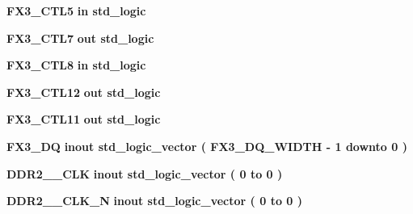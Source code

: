 \begin{DoxyCompactItemize}
{\bf F\+X3\+\_\+\+C\+T\+L5}  {\bfseries {\bfseries \textcolor{keywordflow}{in}\textcolor{vhdlchar}{ }}} {\bfseries \textcolor{comment}{std\+\_\+logic}\textcolor{vhdlchar}{ }} 
\item 
{\bf F\+X3\+\_\+\+C\+T\+L7}  {\bfseries {\bfseries \textcolor{keywordflow}{out}\textcolor{vhdlchar}{ }}} {\bfseries \textcolor{comment}{std\+\_\+logic}\textcolor{vhdlchar}{ }} 
\item 
{\bf F\+X3\+\_\+\+C\+T\+L8}  {\bfseries {\bfseries \textcolor{keywordflow}{in}\textcolor{vhdlchar}{ }}} {\bfseries \textcolor{comment}{std\+\_\+logic}\textcolor{vhdlchar}{ }} 
\item 
{\bf F\+X3\+\_\+\+C\+T\+L12}  {\bfseries {\bfseries \textcolor{keywordflow}{out}\textcolor{vhdlchar}{ }}} {\bfseries \textcolor{comment}{std\+\_\+logic}\textcolor{vhdlchar}{ }} 
\item 
{\bf F\+X3\+\_\+\+C\+T\+L11}  {\bfseries {\bfseries \textcolor{keywordflow}{out}\textcolor{vhdlchar}{ }}} {\bfseries \textcolor{comment}{std\+\_\+logic}\textcolor{vhdlchar}{ }} 
\item 
{\bf F\+X3\+\_\+\+DQ}  {\bfseries {\bfseries \textcolor{keywordflow}{inout}\textcolor{vhdlchar}{ }}} {\bfseries \textcolor{comment}{std\+\_\+logic\+\_\+vector}\textcolor{vhdlchar}{ }\textcolor{vhdlchar}{(}\textcolor{vhdlchar}{ }\textcolor{vhdlchar}{ }\textcolor{vhdlchar}{ }\textcolor{vhdlchar}{ }{\bfseries {\bf F\+X3\+\_\+\+D\+Q\+\_\+\+W\+I\+D\+TH}} \textcolor{vhdlchar}{-\/}\textcolor{vhdlchar}{ } \textcolor{vhdldigit}{1} \textcolor{vhdlchar}{ }\textcolor{keywordflow}{downto}\textcolor{vhdlchar}{ }\textcolor{vhdlchar}{ } \textcolor{vhdldigit}{0} \textcolor{vhdlchar}{ }\textcolor{vhdlchar}{)}\textcolor{vhdlchar}{ }} 
\item 
{\bf D\+D\+R2\+\_\+\_\+\+C\+LK}  {\bfseries {\bfseries \textcolor{keywordflow}{inout}\textcolor{vhdlchar}{ }}} {\bfseries \textcolor{comment}{std\+\_\+logic\+\_\+vector}\textcolor{vhdlchar}{ }\textcolor{vhdlchar}{(}\textcolor{vhdlchar}{ }\textcolor{vhdlchar}{ } \textcolor{vhdldigit}{0} \textcolor{vhdlchar}{ }\textcolor{keywordflow}{to}\textcolor{vhdlchar}{ }\textcolor{vhdlchar}{ } \textcolor{vhdldigit}{0} \textcolor{vhdlchar}{ }\textcolor{vhdlchar}{)}\textcolor{vhdlchar}{ }} 
\item 
{\bf D\+D\+R2\+\_\+\_\+\+C\+L\+K\+\_\+N}  {\bfseries {\bfseries \textcolor{keywordflow}{inout}\textcolor{vhdlchar}{ }}} {\bfseries \textcolor{comment}{std\+\_\+logic\+\_\+vector}\textcolor{vhdlchar}{ }\textcolor{vhdlchar}{(}\textcolor{vhdlchar}{ }\textcolor{vhdlchar}{ } \textcolor{vhdldigit}{0} \textcolor{vhdlchar}{ }\textcolor{keywordflow}{to}\textcolor{vhdlchar}{ }\textcolor{vhdlchar}{ } \textcolor{vhdldigit}{0} \textcolor{vhdlchar}{ }\textcolor{vhdlchar}{)}\textcolor{vhdlchar}{ }} 

\end{DoxyCompactItemize}
